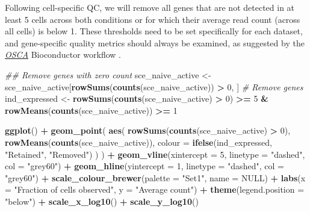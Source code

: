 \documentclass[9pt,a4paper,]{extarticle}
\newenvironment{Shaded}{\begin{snugshade}}{\end{snugshade}}
\newcommand{\CommentTok}[1]{\textcolor[rgb]{0.56,0.35,0.01}{\textit{#1}}}
\newcommand{\DataTypeTok}[1]{\textcolor[rgb]{0.13,0.29,0.53}{#1}}
\newcommand{\DecValTok}[1]{\textcolor[rgb]{0.00,0.00,0.81}{#1}}
\newcommand{\KeywordTok}[1]{\textcolor[rgb]{0.13,0.29,0.53}{\textbf{#1}}}
\newcommand{\NormalTok}[1]{#1}
\newcommand{\OperatorTok}[1]{\textcolor[rgb]{0.81,0.36,0.00}{\textbf{#1}}}
\newcommand{\OtherTok}[1]{\textcolor[rgb]{0.56,0.35,0.01}{#1}}
\newcommand{\StringTok}[1]{\textcolor[rgb]{0.31,0.60,0.02}{#1}}
\begin{document}
Following cell-specific QC, we will remove all genes that are not detected in at
least 5 cells across both conditions or for which their average read count
(across all cells) is below 1.
These thresholds need to be set specifically for each dataset, and
gene-specific quality metrics should always be examined, as suggested by the
\href{https://osca.bioconductor.org/}{\emph{OSCA}} Bioconductor workflow \citep{Amezquita2019}.

\begin{Shaded}
\begin{Highlighting}[]
\CommentTok{## Remove genes with zero count}
\NormalTok{sce_naive_active <-}\StringTok{ }\NormalTok{sce_naive_active[}\KeywordTok{rowSums}\NormalTok{(}\KeywordTok{counts}\NormalTok{(sce_naive_active)) }\OperatorTok{>}\StringTok{ }\DecValTok{0}\NormalTok{, ]}
\CommentTok{# Remove genes}
\NormalTok{ind_expressed <-}\StringTok{ }\KeywordTok{rowSums}\NormalTok{(}\KeywordTok{counts}\NormalTok{(sce_naive_active) }\OperatorTok{>}\StringTok{ }\DecValTok{0}\NormalTok{) }\OperatorTok{>=}\StringTok{ }\DecValTok{5} \OperatorTok{&}
\StringTok{  }\KeywordTok{rowMeans}\NormalTok{(}\KeywordTok{counts}\NormalTok{(sce_naive_active)) }\OperatorTok{>=}\StringTok{ }\DecValTok{1}

\KeywordTok{ggplot}\NormalTok{() }\OperatorTok{+}
\StringTok{  }\KeywordTok{geom_point}\NormalTok{(}
    \KeywordTok{aes}\NormalTok{(}
      \KeywordTok{rowSums}\NormalTok{(}\KeywordTok{counts}\NormalTok{(sce_naive_active) }\OperatorTok{>}\StringTok{ }\DecValTok{0}\NormalTok{),}
      \KeywordTok{rowMeans}\NormalTok{(}\KeywordTok{counts}\NormalTok{(sce_naive_active)),}
      \DataTypeTok{colour =} \KeywordTok{ifelse}\NormalTok{(ind_expressed, }\StringTok{"Retained"}\NormalTok{, }\StringTok{"Removed"}\NormalTok{)}
\NormalTok{    )}
\NormalTok{  ) }\OperatorTok{+}
\StringTok{  }\KeywordTok{geom_vline}\NormalTok{(}\DataTypeTok{xintercept =} \DecValTok{5}\NormalTok{, }\DataTypeTok{linetype =} \StringTok{"dashed"}\NormalTok{, }\DataTypeTok{col =} \StringTok{"grey60"}\NormalTok{) }\OperatorTok{+}
\StringTok{  }\KeywordTok{geom_hline}\NormalTok{(}\DataTypeTok{yintercept =} \DecValTok{1}\NormalTok{, }\DataTypeTok{linetype =} \StringTok{"dashed"}\NormalTok{, }\DataTypeTok{col =} \StringTok{"grey60"}\NormalTok{) }\OperatorTok{+}
\StringTok{  }\KeywordTok{scale_colour_brewer}\NormalTok{(}\DataTypeTok{palette =} \StringTok{"Set1"}\NormalTok{, }\DataTypeTok{name =} \OtherTok{NULL}\NormalTok{) }\OperatorTok{+}
\StringTok{  }\KeywordTok{labs}\NormalTok{(}\DataTypeTok{x =} \StringTok{"Fraction of cells observed"}\NormalTok{, }\DataTypeTok{y =} \StringTok{"Average count"}\NormalTok{) }\OperatorTok{+}
\StringTok{  }\KeywordTok{theme}\NormalTok{(}\DataTypeTok{legend.position =} \StringTok{"below"}\NormalTok{) }\OperatorTok{+}
\StringTok{  }\KeywordTok{scale_x_log10}\NormalTok{() }\OperatorTok{+}
\StringTok{  }\KeywordTok{scale_y_log10}\NormalTok{()}
\end{Highlighting}
\end{Shaded}
\end{document}
